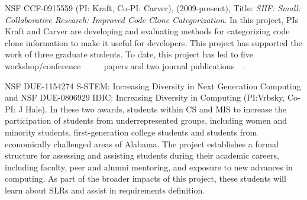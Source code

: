 
NSF CCF-0915559 (PI: Kraft, Co-PI: Carver), (2009-present), Title: \emph{SHF: Small: Collaborative Research: Improved Code Clone Categorization}. In this project, PIs Kraft and Carver are developing and evaluating methods for categorizing code clone information to make it useful for developers. This project has supported the work of three graduate students. To date, this project has led to five workshop/conference~\cite{Beard_et_al:11}~\cite{Carver_et_al:11}~\cite{Chatterji_et_al:11}~\cite{Chatterji_et_al:10}~\cite{Chatterji_et_al:12} papers and two journal publications~\cite{Lukins_et_al:10}~\cite{Pate_et_al:11}.

NSF DUE-1154274 S-STEM: Increasing Diversity in Next Generation Computing and NSF DUE-0806929 IDIC: Increasing Diversity in Computing   (PI:Vrbsky, Co-PI: J Hale).  In these two awards, students within CS and MIS to increase the participation of students from underrepresented groups, including women and minority students, first-generation college students and students from economically challenged areas of Alabama.  The project establishes a formal structure for assessing and assisting students during their academic careers, including faculty, peer and alumni mentoring, and exposure to new advances in computing. As part of the broader impacts of this project, these students will learn about SLRs and assist in requirements definition.    

